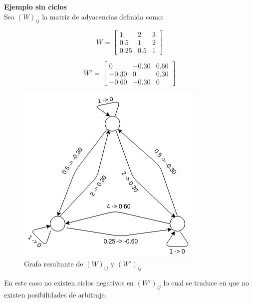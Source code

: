 \textbf{Ejemplo sin ciclos}\\
Sea $(W)_{ij}$ la matriz de adyacencias definida como:
    
\begin{figure}[H] 
    \centering
    \begin{minipage}{0.35\textwidth}
        \centering
\[
W=
  \begin{bmatrix}
    1 & 2 & 3 \\
    0.5 & 1 & 2 \\
    0.25 & 0.5 & 1
  \end{bmatrix}
\]
    \end{minipage}
    \begin{minipage}{0.45\textwidth}
        \centering
\[
W'=
  \begin{bmatrix}
    0 & -0.30 & 0.60 \\
    -0.30 & 0 & 0.30 \\
    -0.60 & -0.30 & 0
  \end{bmatrix}
\]
    \end{minipage}\hfill
\end{figure}


\begin{figure}[H] 
\centering
\includegraphics[width=.3\textwidth]{img/sinCiclos.png}
\caption{Grafo resultante de $(W)_{ij}$ y $(W')_{ij}$}
\label{fig:grafobaseconciclos}
\end{figure}

En este caso no existen ciclos negativos en $(W')_{ij}$ lo cual se traduce en que no existen posibilidades de arbitraje.